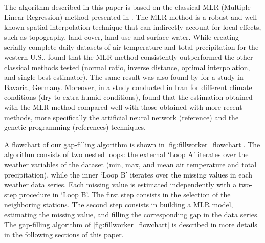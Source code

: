 \documentclass[TechnicalNoteMeteo.tex]{subfiles}
\begin{document}
The algorithm described in this paper is based on the classical MLR (Multiple Linear Regression) method presented in \cite{eischeid_creating_2000}. The MLR method is a robust and well known spatial interpolation technique that can indirectly account for local effects, such as topography, land cover, land use and surface water. While creating serially complete daily datasets of air temperature and total precipitation for the western U.S., \cite{eischeid_creating_2000} found that the MLR method consistently outperformed the other classical methods tested (normal ratio, inverse distance, optimal interpolation, and single best estimator). The same result was also found by \cite{xia_forest_1999} for a study in Bavaria, Germany. Moreover, in a study conducted in Iran for different climate conditions (dry to extra humid conditions), \cite{kashani_evaluation_2011} found that the estimation obtained with the MLR method compared well with those obtained with more recent methods, more specifically the artificial neural network (reference) and the genetic programming (references) techniques.

A flowchart of our gap-filling algorithm is shown in \cref{fig:fillworker_flowchart}. The algorithm consists of two nested loops: the external `Loop A' iterates over the weather variables of the dataset (min, max, and mean air temperature and total precipitation), while the inner `Loop B' iterates over the missing values in each weather data series. Each missing value is estimated independently with a two-step procedure in `Loop B'. The first step consists in the selection of the neighboring stations. The second step consists in building a MLR model, estimating the missing value, and filling the corresponding gap in the data series. The gap-filling algorithm of \cref{fig:fillworker_flowchart} is described in more details in the following sections of this paper.
\end{document}
